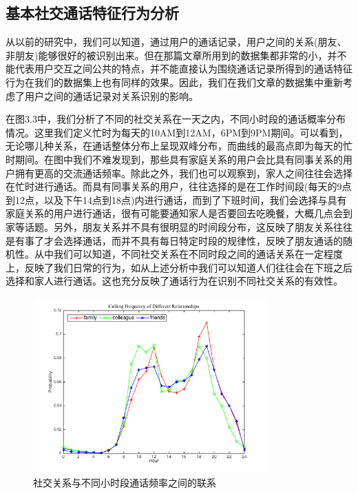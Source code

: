 \subsection{基本社交通话特征行为分析}

从以前的研究中，我们可以知道，通过用户的通话记录，用户之间的关系(朋友、非朋友)能够很好的被识别出来。但在那篇文章所用到的数据集都非常的小，并不能代表用户交互之间公共的特点，并不能直接认为围绕通话记录所得到的通话特征行为在我们的数据集上也有同样的效果。因此，我们在我们文章的数据集中重新考虑了用户之间的通话记录对关系识别的影响。

在图3.3中，我们分析了不同的社交关系在一天之内，不同小时段的通话概率分布情况。这里我们定义忙时为每天的10AM到12AM，6PM到9PM期间。可以看到，无论哪儿种关系，在通话整体分布上呈现双峰分布，而曲线的最高点即为每天的忙时期间。在图中我们不难发现到，那些具有家庭关系的用户会比具有同事关系的用户拥有更高的交流通话频率。除此之外，我们也可以观察到，家人之间往往会选择在忙时进行通话。而具有同事关系的用户，往往选择的是在工作时间段(每天的9点到12点，以及下午14点到18点)内进行通话，而到了下班时间，我们会选择与具有家庭关系的用户进行通话，很有可能要通知家人是否要回去吃晚餐，大概几点会到家等话题。另外，朋友关系并不具有很明显的时间段分布，这反映了朋友关系往往是有事了才会选择通话，而并不具有每日特定时段的规律性，反映了朋友通话的随机性。从中我们可以知道，不同社交关系在不同时段之间的通话关系在一定程度上，反映了我们日常的行为，如从上述分析中我们可以知道人们往往会在下班之后选择和家人进行通话。这也充分反映了通话行为在识别不同社交关系的有效性。



\begin{figure}[ht]
    \centering
    \includegraphics[scale=1,width=0.8\textwidth]{figure/callFrequencyDistribution.png}
    \caption{社交关系与不同小时段通话频率之间的联系}
    \label{fig-callFrequency}
\end{figure}

